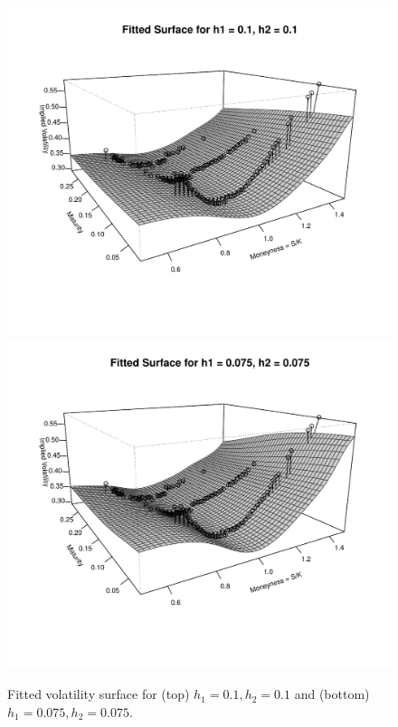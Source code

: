 \documentclass[11pt]{article}
\begin{document}
\begin{figure}[H]
	\centering
 	\includegraphics[scale=0.75]{../plots/q2/fitted_2d_01_01.pdf}
	\includegraphics[scale=0.75]{../plots/q2/fitted_2d_0075_0075.pdf}
\caption{Fitted volatility surface for (top) $h_1 = 0.1, h_2 = 0.1$ and (bottom) $h_1 = 0.075, h_2 = 0.075$.}
\label{fig:fitted_2d_01_01_0075_0075}
\end{figure}
\end{document}
